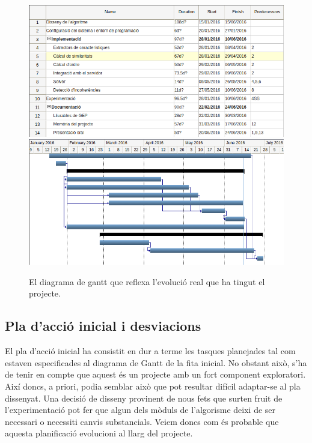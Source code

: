 \begin{figure}[!htb]
    \centering
    \includegraphics[width=\textwidth]{figures/gantt2_1.png}
    \includegraphics[width=\textwidth]{figures/gantt2_2.png}
    \caption{El diagrama de gantt que reflexa l'evolució real que ha tingut el projecte.}
    \label{fig:gantt}
\end{figure}

\clearpage

\subsection{Pla d'acció inicial i desviacions}

El pla d'acció inicial ha consistit en dur a terme les tasques planejades tal com estaven especificades al diagrama de Gantt de la fita inicial. No obstant això, s'ha de tenir en compte que aquest és un projecte amb un fort component exploratori. Així doncs, a priori, podia semblar això que pot resultar difícil adaptar-se al pla dissenyat. Una decisió de disseny provinent de nous fets que surten fruit de l'experimentació pot fer que algun dels mòduls de l'algorisme deixi de ser necessari o necessiti canvis substancials. Veiem doncs com és probable que aquesta planificació evolucioni al llarg del projecte.

